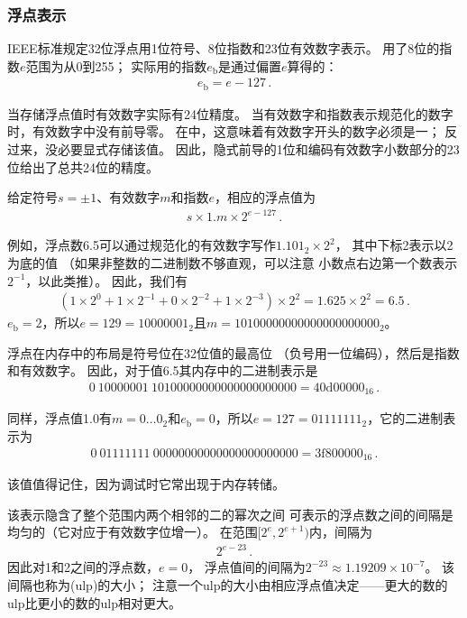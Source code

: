 \subsubsection*{浮点表示}
IEEE标准规定32位浮点用1位符号、8位指数和23位有效数字表示。
用了8位的指数$e$范围为从0到255；
实际用的指数$e_{\mathrm{b}}$是通过偏置$e$算得的：
\begin{align*}
    e_{\mathrm{b}}=e-127\, .
\end{align*}

当存储浮点值时有效数字实际有24位精度。
当有效数字和指数表示规范化的数字时，有效数字中没有前导零。
在中，这意味着有效数字开头的数字必须是一；
反过来，没必要显式存储该值。
因此，隐式前导的1位和编码有效数字小数部分的23位给出了总共24位的精度。

给定符号$s=\pm 1$、有效数字$m$和指数$e$，相应的浮点值为
\begin{align*}
    s\times 1.m\times2^{e-127}\, .
\end{align*}

例如，浮点数6.5可以通过规范化的有效数字写作$1.101_2\times2^2$，
其中下标2表示以2为底的值
（如果非整数的二进制数不够直观，可以注意
小数点右边第一个数表示$2^{-1}$，以此类推）。
因此，我们有
\begin{align*}
    (1\times2^0+1\times2^{-1}+0\times2^{-2}+1\times2^{-3})\times2^2=1.625\times2^2=6.5\, .
\end{align*}
$e_{\mathrm{b}}=2$，所以$e=129=10000001_2$且$m=10100000000000000000000_2$。

浮点在内存中的布局是符号位在32位值的最高位
（负号用一位编码），然后是指数和有效数字。
因此，对于值6.5其内存中的二进制表示是
\begin{align*}
    0\ 10000001\ 10100000000000000000000=40\mathrm{d}00000_{16}\, .
\end{align*}

同样，浮点值1.0有$m=0\ldots0_2$和$e_{\mathrm{b}}=0$，所以$e=127=01111111_2$，它的二进制表示为
\begin{align*}
    0\ 01111111\ 00000000000000000000000=3\mathrm{f}800000_{16}\, .
\end{align*}

该值值得记住，因为调试时它常出现于内存转储。

该表示隐含了整个范围内两个相邻的二的幂次之间
可表示的浮点数之间的间隔是均匀的（它对应于有效数字位增一）。
在范围$[2^e,2^{e+1})$内，间隔为
\begin{align}\label{eq:3.6}
    2^{e-23}\, .
\end{align}
因此对1和2之间的浮点数，$e=0$，
浮点值间的间隔为$2^{-23}\approx1.19209\times10^{-7}$。
该间隔也称为(ulp)的大小；
注意一个ulp的大小由相应浮点值决定——更大的数的ulp比更小的数的ulp相对更大。

